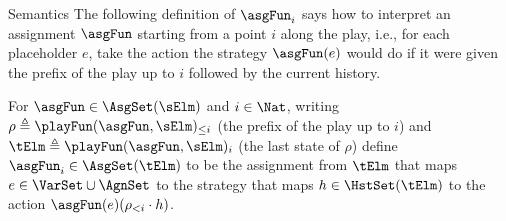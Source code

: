 \begin{subsection}{Semantics}
 		The following definition of $\asgFun_i$ says how to interpret an assignment $\asgFun$ starting from a point $i$ along the play, i.e.,
 		for each placeholder $e$, take the action the strategy $\asgFun(e)$ would do if it were given the prefix of the play up to $i$ followed by
 		the current history.
 		\begin{definition}
		For $\asgFun \in \AsgSet(\sElm)$ and $i \in \Nat$, writing
		$\rho \defeq \playFun(\asgFun,\sElm)_{\leq i}$ (the prefix of the play up to $i$) and $\tElm \defeq \playFun(\asgFun,\sElm)_i$ (the last state of $\rho$)
		define $\asgFun_i \in \AsgSet(\tElm)$ to be the assignment from $\tElm$ that maps
		$e \in \VarSet \cup \AgnSet$ to the strategy that maps $h \in \HstSet(\tElm)$ to the action $\asgFun(e)(\rho_{< i} \cdot h)$.
 		\end{definition}
		

\end{subsection}

